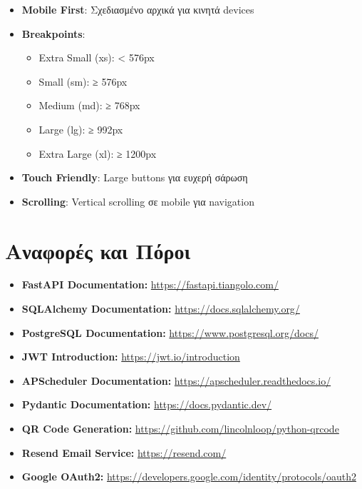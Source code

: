 \documentclass[12pt,a4paper]{report}
\begin{document}
\begin{itemize}
    \item \textbf{Mobile First}: Σχεδιασμένο αρχικά για κινητά devices
    \item \textbf{Breakpoints}:
    \begin{itemize}
        \item Extra Small (xs): < 576px
        \item Small (sm): ≥ 576px
        \item Medium (md): ≥ 768px
        \item Large (lg): ≥ 992px
        \item Extra Large (xl): ≥ 1200px
    \end{itemize}
    \item \textbf{Touch Friendly}: Large buttons για ευχερή σάρωση
    \item \textbf{Scrolling}: Vertical scrolling σε mobile για navigation
\end{itemize}

\appendix

\chapter{Αναφορές και Πόροι}

\begin{itemize}
    \item \textbf{FastAPI Documentation:} \url{https://fastapi.tiangolo.com/}
    \item \textbf{SQLAlchemy Documentation:} \url{https://docs.sqlalchemy.org/}
    \item \textbf{PostgreSQL Documentation:} \url{https://www.postgresql.org/docs/}
    \item \textbf{JWT Introduction:} \url{https://jwt.io/introduction}
    \item \textbf{APScheduler Documentation:} \url{https://apscheduler.readthedocs.io/}
    \item \textbf{Pydantic Documentation:} \url{https://docs.pydantic.dev/}
    \item \textbf{QR Code Generation:} \url{https://github.com/lincolnloop/python-qrcode}
    \item \textbf{Resend Email Service:} \url{https://resend.com/}
    \item \textbf{Google OAuth2:} \url{https://developers.google.com/identity/protocols/oauth2}
\end{itemize}
\end{document}
